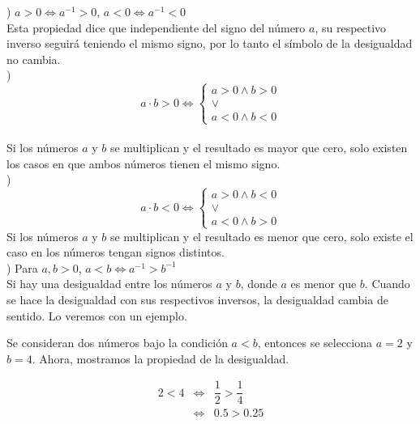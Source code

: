 ) $a>0\Leftrightarrow a^{-1}>0$, \hspace{10px} $a<0\Leftrightarrow a^{-1}<0$\\
Esta propiedad dice que independiente del signo del número $a$, su respectivo inverso seguirá teniendo el mismo signo, por lo tanto el símbolo de la desigualdad no cambia.\\
 
) $$ a\cdot b>0\Leftrightarrow \left\{ 
\begin{array}{ll}
a>0 \wedge b>0\\
\vee \\
a<0 \wedge b<0
\end{array}
\right. $$\\
Si los números $a$ y $b$ se multiplican y el resultado es mayor que cero, solo existen los casos en que ambos números tienen el mismo signo.\\

) $$ a\cdot b<0 \Leftrightarrow \left\{\begin{array}{ll}
a>0 \wedge b<0\\
\vee \\
a<0 \wedge b>0
\end{array} \right.$$
Si los números $a$ y $b$ se multiplican y el resultado es menor que cero, solo existe el caso en los números tengan signos distintos.\\

) Para $a,b>0$, $a<b\Leftrightarrow a^{-1}>b^{-1}$\\
Si hay una desigualdad entre los números $a$ y $b$, donde $a$ es menor que $b$. Cuando se hace la desigualdad con sus respectivos inversos, la desigualdad cambia de sentido. Lo veremos con un ejemplo.\\

\begin{myexample}
Se consideran dos números bajo la condición $a<b$, entonces se selecciona $a=2$ y $b=4$. Ahora, mostramos la propiedad de la desigualdad. 
\end{myexample}
\begin{eqnarray*}
2<4&\Leftrightarrow & \dfrac{1}{2}>\dfrac{1}{4}\\
&\Leftrightarrow & 0.5>0.25
\end{eqnarray*}
